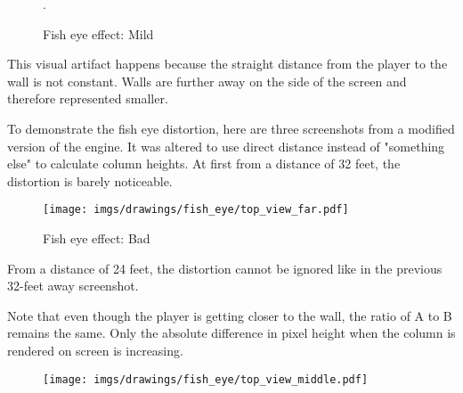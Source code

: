 \begin{minipage}{\textwidth}

    \begin{figure}[H]
    \centering
    \vspace{-10pt}
     \caption{Fish eye effect: Mild}. \label{fig:mips}
     \end{figure} 


    \begin{minipage}{.4\textwidth}
    This visual artifact happens because the straight distance from the player to the wall is not constant. Walls are further away on the side of the screen and therefore represented smaller.\\
    \par
    To demonstrate the fish eye distortion, here are three screenshots from a modified version of the engine. It was altered to use direct distance  instead of "something else" to calculate column heights. At first from a distance of 32 feet, the distortion is barely noticeable.\\
     \end{minipage}
    \begin{minipage}{.6\textwidth}
    \begin{figure}[H]
      \begin{flushright}
     \texttt{[image: imgs/drawings/fish\_eye/top\_view\_far.pdf]}
       \end{flushright}
    \end{figure}
    \end{minipage}
\end{minipage}
\par



\begin{minipage}{\textwidth}
\begin{figure}[H]
\centering
 \caption{Fish eye effect: Bad} \label{fig:mips}
 \end{figure}
\begin{minipage}{.4\textwidth}
From a distance of 24 feet, the distortion cannot be ignored like in the previous 32-feet away screenshot.\\
\par
Note that even though the player is getting closer to the wall, the ratio of A to B remains the same. Only the absolute difference in pixel height when the column is rendered on screen is increasing.
 \end{minipage}
\begin{minipage}{.6\textwidth}
\begin{figure}[H]
  \begin{flushright}
 \texttt{[image: imgs/drawings/fish\_eye/top\_view\_middle.pdf]}
 \end{flushright}
\end{figure}
\end{minipage}
\end{minipage}




